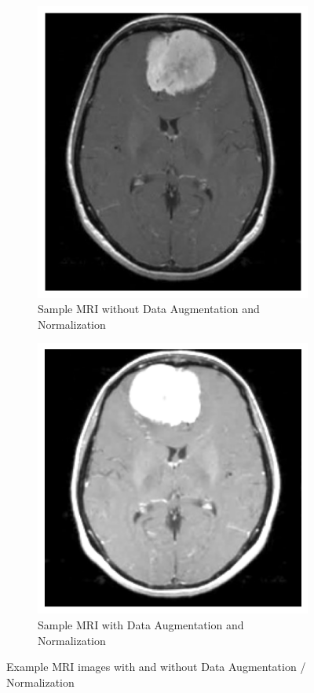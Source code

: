 \documentclass[11pt]{article}
\begin{document}
\begin{figure}[H]
\centering
\begin{subfigure}[b]{0.45\textwidth}
\centering
\includegraphics[width=\textwidth]{figures/normal_img.png}
\caption{Sample MRI without Data Augmentation and Normalization}
\label{fig:image1}
\end{subfigure}
\hfill
\begin{subfigure}[b]{0.45\textwidth}
\centering
\includegraphics[width=\textwidth]{figures/transformed_img.png}
\caption{Sample MRI with Data Augmentation and Normalization}
\label{fig:image2}
\end{subfigure}
\caption{Example MRI images with and without Data Augmentation / Normalization}
\label{fig:sample_mris}
\end{figure}
\end{document}
